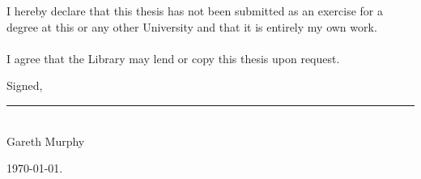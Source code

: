 
\vspace*{3cm}
%
\noi I hereby declare that this thesis has not been submitted as an exercise for a degree at this or any other University and that it is entirely my own work. \\ \\ 
%
I agree that the Library may lend or copy this thesis upon request.

\vspace*{2cm}
\hspace*{9cm} Signed,

\vspace*{2.5cm}
\hspace*{9cm} \rule[0pt]{6cm}{0.01cm} \\ 
\hspace*{9.6cm} Gareth Murphy

\vspace*{2cm}
\hspace{9cm} \today. 

